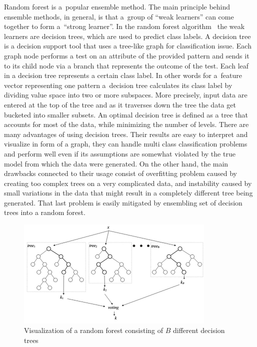 Random forest is a~popular ensemble method. The main principle behind ensemble methods, in general, is that a~group of ``weak learners'' can come together to form a~``strong learner''\cite{EnsembleMethods}. In the random forest algorithm~\cite{Breiman2001} the weak learners are decision trees, which are used to predict class labels. A decision tree is a decision support tool that uses a tree-like graph for classification issue. Each graph node performs a test on an attribute of the provided pattern and sends it to its child node via a branch that represents the outcome of the test. Each leaf in a decision tree represents a certain class label. In other words for a~feature vector representing one pattern a~decision tree calculates its class label by dividing value space into two or more subspaces. More precisely, input data are entered at the top of the tree and as it traverses down the tree the data get bucketed into smaller subsets. An optimal decision tree is defined as a tree that accounts for most of the data, while minimizing the number of levels\cite{RQuinlan}. There are many advantages of using decision trees. Their results are easy to interpret and visualize in form of a graph, they can handle multi class classification problems and perform well even if its assumptions are somewhat violated by the true model from which the data were generated. On the other hand, the main drawbacks connected to their usage consist of overfitting problem caused by creating too complex trees on a very complicated data, and instability caused by small variations in the data that might result in a completely different tree being generated. That last problem is easily mitigated by ensembling set of decision trees into a random forest. 

\begin{figure}[htp]
	\centering
	\includegraphics[width=0.85\textwidth]{Figures/rf_visualization.jpg}
	\caption{Visualization of a random forest consisting of $B$ different decision trees}
	\label{fig:rf_visualization}\vspace{-3pt}
\end{figure}

